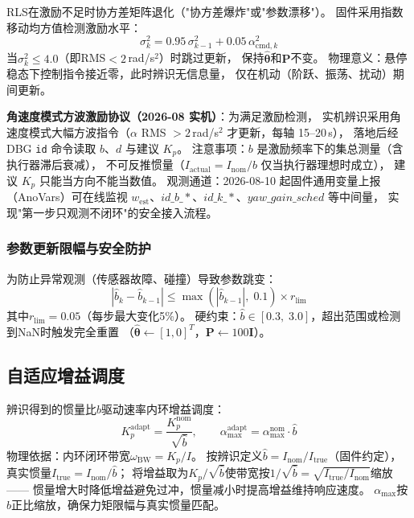 RLS在激励不足时协方差矩阵退化（"协方差爆炸"或"参数漂移"）。
固件采用指数移动均方值检测激励水平：
\begin{equation}
    \sigma_k^2 = 0.95\,\sigma_{k-1}^2 + 0.05\,\alpha_{\mathrm{cmd},k}^2
    \label{eq:excitation}
\end{equation}
当$\sigma_k^2\leq4.0$（即RMS$<2$\,rad/s$^2$）时跳过更新，
保持$\hat{\boldsymbol{\theta}}$和$\mathbf{P}$不变。
物理意义：悬停稳态下控制指令接近零，此时辨识无信息量，
仅在机动（阶跃、振荡、扰动）期间更新。

\textbf{角速度模式方波激励协议（2026-08 实机）}：为满足激励检测，
实机辨识采用角速度模式大幅方波指令（$\alpha$ RMS $>2$\,rad/s$^2$ 才更新，每轴 15--20\,s），
落地后经 DBG \texttt{id} 命令读取 $b$、$d$ 与建议 $K_p$。
注意事项：$b$ 是激励频率下的集总测量（含执行器滞后衰减），
不可反推惯量（$I_{\text{actual}}=I_{\text{nom}}/b$ 仅当执行器理想时成立），
建议 $K_p$ 只能当方向不能当数值。
观测通道：2026-08-10 起固件通用变量上报（AnoVars）可在线监视
$w_{\text{est}}$、$id\_b\_*$、$id\_k\_*$、$yaw\_gain\_sched$ 等中间量，
实现"第一步只观测不闭环"的安全接入流程。

\subsubsection{参数更新限幅与安全防护}

为防止异常观测（传感器故障、碰撞）导致参数跳变：
\begin{equation}
    |\hat{b}_k - \hat{b}_{k-1}|
    \leq \max(|\hat{b}_{k-1}|,\;0.1)\times r_{\lim}
    \label{eq:rate_limit}
\end{equation}
其中$r_{\lim}=0.05$（每步最大变化5\%）。
硬约束：$\hat{b}\in[0.3,\;3.0]$，超出范围或检测到NaN时触发完全重置
（$\hat{\boldsymbol{\theta}}\leftarrow[1,0]^T$，$\mathbf{P}\leftarrow100\mathbf{I}$）。

\subsection{自适应增益调度}
\label{sec:adaptive_scheduling}

辨识得到的惯量比$\hat{b}$驱动速率内环增益调度：
\begin{equation}
    \boxed{
    K_p^{\mathrm{adapt}} = \frac{K_p^{\mathrm{nom}}}{\sqrt{\hat{b}}},
    \qquad
    \alpha_{\max}^{\mathrm{adapt}} = \alpha_{\max}^{\mathrm{nom}}\cdot\hat{b}
    }
    \label{eq:gain_scheduling}
\end{equation}
物理依据：内环闭环带宽$\omega_{\mathrm{BW}}=K_p/I$。
按辨识定义$\hat{b}=I_{\mathrm{nom}}/I_{\mathrm{true}}$（固件约定），真实惯量$I_{\mathrm{true}}=I_{\mathrm{nom}}/\hat{b}$；
将增益取为$K_p/\sqrt{\hat{b}}$使带宽按$1/\sqrt{\hat{b}}=\sqrt{I_{\mathrm{true}}/I_{\mathrm{nom}}}$缩放——
惯量增大时降低增益避免过冲，惯量减小时提高增益维持响应速度。
$\alpha_{\max}$按$\hat{b}$正比缩放，确保力矩限幅与真实惯量匹配。

